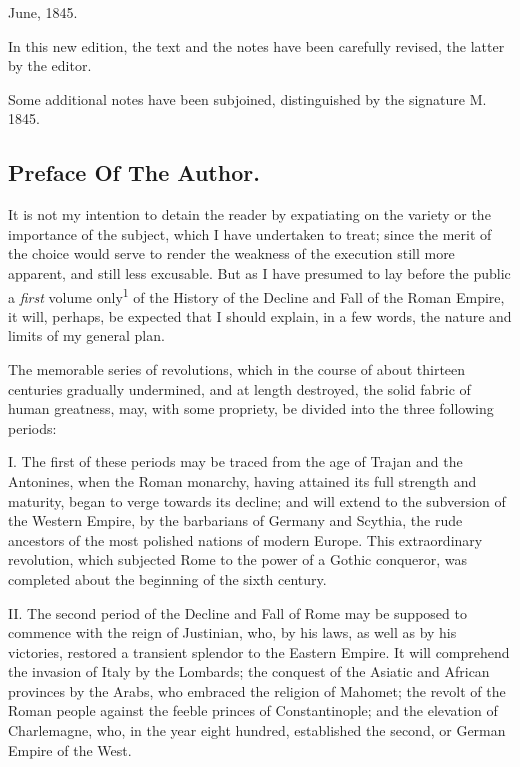 June, 1845.

In this new edition, the text and the notes have been carefully revised, the
latter by the editor.

Some additional notes have been subjoined, distinguished by the signature M. 1845.

\subsection{Preface Of The Author.}

It is not my intention to detain the reader by expatiating on the variety or the
importance of the subject, which I have undertaken to treat; since the merit
of the choice would serve to render the weakness of the execution still more
apparent, and still less excusable. But as I have presumed to lay before the
public a \textit{first} volume only\textsuperscript{1} of the History of the
Decline and Fall of the Roman Empire, it will, perhaps, be expected that I
should explain, in a few words, the nature and limits of my general plan.


The memorable series of revolutions, which in the course of about thirteen
centuries gradually undermined, and at length destroyed, the solid fabric of
human greatness, may, with some propriety, be divided into the three following
periods:

I. The first of these periods may be traced from the age of Trajan and the
Antonines, when the Roman monarchy, having attained its full strength and
maturity, began to verge towards its decline; and will extend to the subversion
of the Western Empire, by the barbarians of Germany and Scythia, the rude
ancestors of the most polished nations of modern Europe. This extraordinary
revolution, which subjected Rome to the power of a Gothic conqueror, was
completed about the beginning of the sixth century.

II. The second period of the Decline and Fall of Rome may be supposed to
commence with the reign of Justinian, who, by his laws, as well as by his
victories, restored a transient splendor to the Eastern Empire. It will
comprehend the invasion of Italy by the Lombards; the conquest of the Asiatic
and African provinces by the Arabs, who embraced the religion of Mahomet; the
revolt of the Roman people against the feeble princes of Constantinople; and
the elevation of Charlemagne, who, in the year eight hundred, established the
second, or German Empire of the West.

